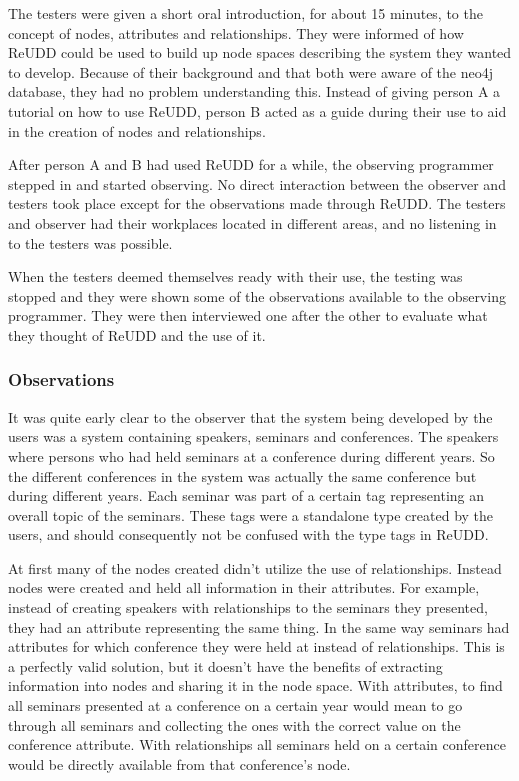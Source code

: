 \documentclass[a4paper]{report}
\begin{document}
The testers were given a short oral introduction, for about 15 minutes, to the concept of nodes, attributes and relationships. They were informed of how ReUDD could be used to build up node spaces describing the system they wanted to develop. Because of their background and that both were aware of the neo4j database, they had no problem understanding this. Instead of giving person A a tutorial on how to use ReUDD, person B acted as a guide during their use to aid in the creation of nodes and relationships.

After person A and B had used ReUDD for a while, the observing programmer stepped in and started observing. No direct interaction between the observer and testers took place except for the observations made through ReUDD. The testers and observer had their workplaces located in different areas, and no listening in to the testers was possible.

When the testers deemed themselves ready with their use, the testing was stopped and they were shown some of the observations available to the observing programmer. They were then interviewed one after the other to evaluate what they thought of ReUDD and the use of it.

\subsubsection{Observations}
It was quite early clear to the observer that the system being developed by the users was a system containing speakers, seminars and conferences. The speakers where persons who had held seminars at a conference during different years. So the different conferences in the system was actually the same conference but during different years. Each seminar was part of a certain tag representing an overall topic of the seminars. These tags were a standalone type created by the users, and should consequently not be confused with the type tags in ReUDD.

At first many of the nodes created didn't utilize the use of relationships. Instead nodes were created and held all information in their attributes. For example, instead of creating speakers with relationships to the seminars they presented, they had an attribute representing the same thing. In the same way seminars had attributes for which conference they were held at instead of relationships. This is a perfectly valid solution, but it doesn't have the benefits of extracting information into nodes and sharing it in the node space. With attributes, to find all seminars presented at a conference on a certain year would mean to go through all seminars and collecting the ones with the correct value on the conference attribute. With relationships all seminars held on a certain conference would be directly available from that conference's node.
\end{document}
